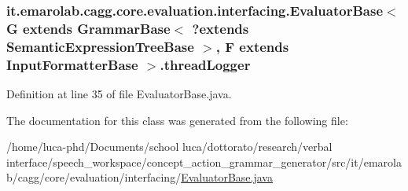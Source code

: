 \hypertarget{classit_1_1emarolab_1_1cagg_1_1core_1_1evaluation_1_1interfacing_1_1EvaluatorBase_3_01G_01extendd61d057930241954f97ab0cbf4992dd1_a559fb61baeafd47b0f1cec2a6e5924b4}{
\subsubsection[{thread\-Logger}]{ it.\-emarolab.\-cagg.\-core.\-evaluation.\-interfacing.\-Evaluator\-Base$<$ G extends Grammar\-Base$<$ ?extends {\bf Semantic\-Expression\-Tree\-Base} $>$, F extends {\bf Input\-Formatter\-Base} $>$.thread\-Logger\hspace{0.3cm}{\ttfamily [private]}}}\label{classit_1_1emarolab_1_1cagg_1_1core_1_1evaluation_1_1interfacing_1_1EvaluatorBase_3_01G_01extendd61d057930241954f97ab0cbf4992dd1_a559fb61baeafd47b0f1cec2a6e5924b4}


Definition at line 35 of file Evaluator\-Base.\-java.



The documentation for this class was generated from the following file\-:\begin{DoxyCompactItemize}
\item 
/home/luca-\/phd/\-Documents/school luca/dottorato/research/verbal interface/speech\-\_\-workspace/concept\-\_\-action\-\_\-grammar\-\_\-generator/src/it/emarolab/cagg/core/evaluation/interfacing/\hyperlink{EvaluatorBase_8java}{Evaluator\-Base.\-java}\end{DoxyCompactItemize}
